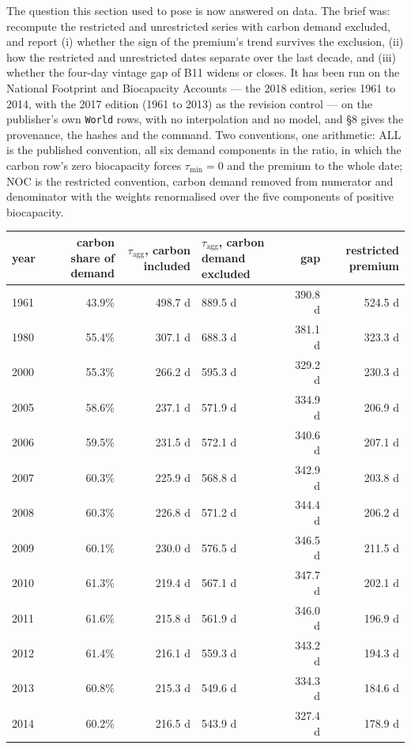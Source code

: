 \documentclass[11pt]{article}
\begin{document}
The question this section used to pose is now answered on data. The brief was: recompute the restricted and unrestricted series with carbon demand excluded, and report (i) whether the sign of the premium's trend survives the exclusion, (ii) how the restricted and unrestricted dates separate over the last decade, and (iii) whether the four-day vintage gap of B11 widens or closes. It has been run on the National Footprint and Biocapacity Accounts --- the 2018 edition, series 1961 to 2014, with the 2017 edition (1961 to 2013) as the revision control --- on the publisher's own \texttt{World} rows, with no interpolation and no model, and \S8 gives the provenance, the hashes and the command. Two conventions, one arithmetic: ALL is the published convention, all six demand components in the ratio, in which the carbon row's zero biocapacity forces \(\tau_{\min} = 0\) and the premium to the whole date; NOC is the restricted convention, carbon demand removed from numerator and denominator with the weights renormalised over the five components of positive biocapacity.

\begin{longtable}{@{}l|r|r|p{31mm}|r|r@{}}
\toprule
year & carbon share of demand & \(\tau_{\mathrm{agg}}\), carbon included & \(\tau_{\mathrm{agg}}\), carbon demand excluded & gap & restricted premium \\
\midrule
1961 & 43.9\% & 498.7 d & 889.5 d & 390.8 d & 524.5 d \\
1980 & 55.4\% & 307.1 d & 688.3 d & 381.1 d & 323.3 d \\
2000 & 55.3\% & 266.2 d & 595.3 d & 329.2 d & 230.3 d \\
2005 & 58.6\% & 237.1 d & 571.9 d & 334.9 d & 206.9 d \\
2006 & 59.5\% & 231.5 d & 572.1 d & 340.6 d & 207.1 d \\
2007 & 60.3\% & 225.9 d & 568.8 d & 342.9 d & 203.8 d \\
2008 & 60.3\% & 226.8 d & 571.2 d & 344.4 d & 206.2 d \\
2009 & 60.1\% & 230.0 d & 576.5 d & 346.5 d & 211.5 d \\
2010 & 61.3\% & 219.4 d & 567.1 d & 347.7 d & 202.1 d \\
2011 & 61.6\% & 215.8 d & 561.9 d & 346.0 d & 196.9 d \\
2012 & 61.4\% & 216.1 d & 559.3 d & 343.2 d & 194.3 d \\
2013 & 60.8\% & 215.3 d & 549.6 d & 334.3 d & 184.6 d \\
2014 & 60.2\% & 216.5 d & 543.9 d & 327.4 d & 178.9 d \\
\bottomrule
\end{longtable}
\end{document}
